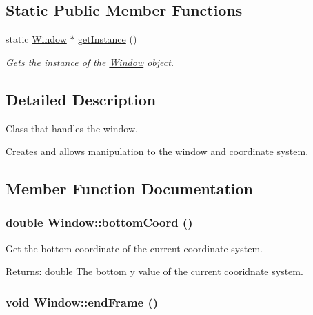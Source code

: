 \subsection*{Static Public Member Functions}
\begin{CompactItemize}
\item 
static \hyperlink{class_window}{Window} $\ast$ \hyperlink{class_window_9168e673f5c1866c4b1b41be425e88d6}{getInstance} ()
\begin{CompactList}\small\item\em Gets the instance of the \hyperlink{class_window}{Window} object. \item\end{CompactList}\end{CompactItemize}


\subsection{Detailed Description}
Class that handles the window. 

Creates and allows manipulation to the window and coordinate system. 

\subsection{Member Function Documentation}
\hypertarget{class_window_cae395291c4864a6eb892a710e5e119d}{
\subsubsection[{bottomCoord}]{\setlength{\rightskip}{0pt plus 5cm}double Window::bottomCoord ()}}
\label{class_window_cae395291c4864a6eb892a710e5e119d}


Get the bottom coordinate of the current coordinate system. 

\begin{Desc}
\item[Returns:]double The bottom y value of the current cooridnate system. \end{Desc}
\hypertarget{class_window_592a9d616c06e1dacab0ac261f918865}{
\subsubsection[{endFrame}]{\setlength{\rightskip}{0pt plus 5cm}void Window::endFrame ()}}
\label{class_window_592a9d616c06e1dacab0ac261f918865}


